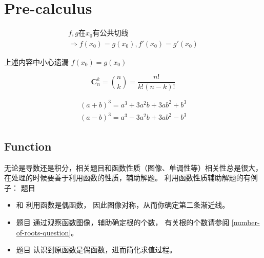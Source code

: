 \chapter{Pre-calculus}

\begin{lemma}
\begin{multline*}
	f, g \mbox{在} x_0 \mbox{有公共切线} \\ \Rightarrow f(x_0) = g(x_0), f'(x_0) = g'(x_0)
\end{multline*}
\end{lemma}
上述内容中小心遗漏 $f(x_0) = g(x_0)$

\begin{definition}
    \begin{equation}
        \mathbf{C}_{n}^{k} = \binom{n}{k} = \frac{n!}{k!(n-k)!}
    \end{equation}
\end{definition}

\begin{lemma}
    \begin{align*}
        (a+b)^3 = a^3 + 3a^2b + 3ab^2 + b^3\\
        (a-b)^3 = a^3 - 3a^2b + 3ab^2 - b^3
    \end{align*}
\end{lemma}

\section{Function}

无论是导数还是积分，相关题目和函数性质（图像、单调性等）相关性总是很大，
在处理的时候要善于利用函数的性质，辅助解题。
利用函数性质辅助解题的有例子：
题目 
\begin{itemize}

    \item   \cite[page 70, pdf 81, 例1]{we} 和 
            \cite[page 75, pdf 86, 例6]{we}利用函数是偶函数，
            因此图像对称，从而你确定第二条渐近线。

    \item   题目 \cite[page 77, pdf 88, 例5, 例6]{we} 
            通过观察函数图像，辅助确定根的个数，
            有关根的个数请参阅 \ref{number-of-roots-question}。

    \item   题目 \cite[page 107, pdf 118, example 4]{we}
            认识到原函数是偶函数，进而简化求值过程。

\end{itemize}

